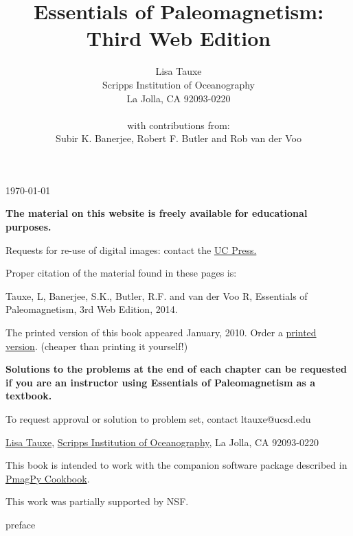 \documentclass[11pt]{book}
\begin{document}
  \newcommand{\be}{\begin{equation}}%
\newcommand{\ee}{\end{equation}}%

 
 
 \title{Essentials of  Paleomagnetism: Third Web Edition}
 \author{Lisa Tauxe\\Scripps Institution of Oceanography\\La Jolla, CA 92093-0220\\ \\
  with contributions from: \\ Subir K. Banerjee, Robert F. Butler and Rob van der Voo}
  \today
 \maketitle
 
{\bf The material on this website is freely available for educational purposes. }

Requests for re-use of digital images: contact the \href{http://http://www.ucpress.edu}{UC Press.}

Proper citation of the material found in these pages is: 

Tauxe, L, Banerjee, S.K., Butler, R.F. and van der Voo R, Essentials of Paleomagnetism, 3rd Web Edition, 2014. 

The printed version of this book appeared January, 2010. Order a \href{http://www.ucpress.edu/books/pages/11183.php}{printed version}. (cheaper than printing it yourself!)

{\bf Solutions to the problems at the end of each chapter can be requested if you are an instructor using Essentials of Paleomagnetism as a textbook.}

To request approval or solution to problem set, contact ltauxe@ucsd.edu 

\href{http://magician.ucsd.edu/~ltauxe/}{Lisa Tauxe}, \href{http://scripps.ucsd.edu}{Scripps Institution of Oceanography}, La Jolla, CA 92093-0220

This book is intended to work with the companion software package described in \href{http://earthref.org/PmagPy/cookbook/}{PmagPy Cookbook}.   

This work was partially supported by NSF.

\setcounter{page}{1}
 {preface}
\setcounter{tocdepth}{3}
\tableofcontents
\clearpage
{}
\setcounter{page}{1}




 


  




 

 




\end{document}
